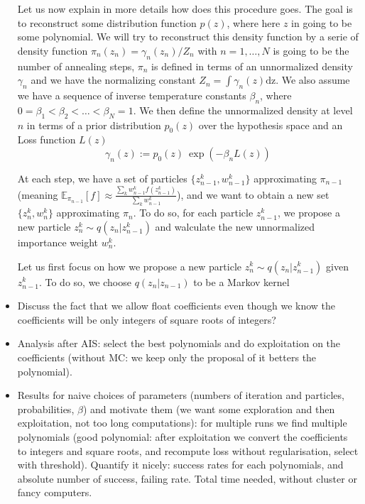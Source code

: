 \documentclass[11pt]{article}
\begin{document}
\begin{itemize}[label=\textbullet]
		Let us now explain in more details how does this procedure goes. The goal is to reconstruct some distribution function $p(z)$, where here $z$ in going to be some polynomial. We will try to reconstruct this density function by a serie of density function $\pi_n(z_n) = \gamma_n(z_n)/Z_n$ with $n = 1,\dots,N$ is going to be the number of annealing steps, $\pi_n$ is defined in terms of an unnormalized density $\gamma_n$ and we have the normalizing constant $Z_n = \int \gamma_n(z) \mathrm{dz}$. We also assume we have a sequence of inverse temperature constants $\beta_n$, where $0 = \beta_1 < \beta_2 <\dots< \beta_N = 1$. We then define the unnormalized density at level $n$ in terms of a prior distribution $p_0(z)$ over the hypothesis space and an Loss function $L(z)$
		\begin{equation}
			\gamma_n(z) := p_0(z) \: \exp \left( -\beta_n L(z) \right)
		\end{equation} 
		
		At each step, we have a set of particles $\{z_{n-1}^k, w_{n-1}^k\}$ approximating $\pi_{n-1}$ (meaning $\mathbb{E}_{\pi_{n-1}}[f] \approx \frac{\sum_k w_{n-1}^k f(z_{n-1}^k)}{\sum_k w_{n-1}^k}$), and we want to obtain a new set $\{z_n^k, w_n^k\}$ approximating $\pi_n$. To do so, for each particle $z^k_{n-1}$, we propose a new particle $z_n^k \sim q(z_n | z_{n-1}^k)$ and walculate the new unnormalized importance weight $w_n^k$. 
		
		Let us first focus on how we propose a new particle $z_n^k \sim q(z_n | z_{n-1}^k)$ given $z_{n-1}^k$. To do so, we choose $q(z_n | z_{n-1})$ to be a Markov kernel 
		
		\item Discuss the fact that we allow float coefficients even though we know the coefficients will be only integers of square roots of integers?
		\item Analysis after AIS: select the best polynomials and do exploitation on the coefficients (without MC: we keep only the proposal of it betters the polynomial).
		\item Results for naive choices of parameters (numbers of iteration and particles, probabilities, $\beta$) and motivate them (we want some exploration and then exploitation, not too long computations): for multiple runs we find multiple polynomials (good polynomial: after exploitation we convert the coefficients to integers and square roots, and recompute loss without regularisation, select with threshold). Quantify it nicely: success rates for each polynomials, and absolute number of success, failing rate. Total time needed, without cluster or fancy computers.
	\end{itemize}
\end{document}

